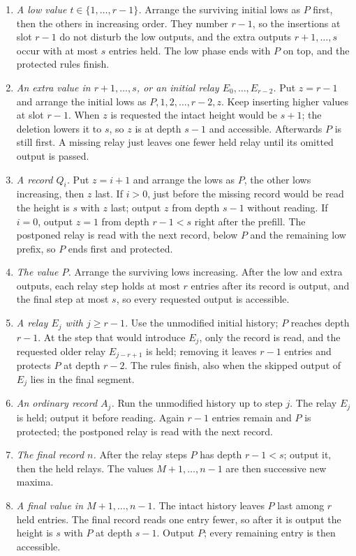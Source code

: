 \documentclass[11pt,letterpaper]{article}
\providecommand{\tightlist}{\setlength{\itemsep}{0pt}\setlength{\parskip}{0pt}}
\begin{document}
\begin{enumerate}
\def\labelenumi{\arabic{enumi}.}
\tightlist
\item
  \emph{A low value \(t\in\{1,\dots,r-1\}\).} Arrange the surviving
  initial lows as \(P\) first, then the others in increasing order. They
  number \(r-1\), so the insertions at slot \(r-1\) do not disturb the
  low outputs, and the extra outputs \(r+1,\dots,s\) occur with at most
  \(s\) entries held. The low phase ends with \(P\) on top, and the
  protected rules finish.
\item
  \emph{An extra value in \(r+1,\dots,s\), or an initial relay
  \(E_0,\dots,E_{r-2}\).} Put \(z=r-1\) and arrange the initial lows as
  \(P,1,2,\dots,r-2,z\). Keep inserting higher values at slot \(r-1\).
  When \(z\) is requested the intact height would be \(s+1\); the
  deletion lowers it to \(s\), so \(z\) is at depth \(s-1\) and
  accessible. Afterwards \(P\) is still first. A missing relay just
  leaves one fewer held relay until its omitted output is passed.
\item
  \emph{A record \(Q_i\).} Put \(z=i+1\) and arrange the lows as \(P\),
  the other lows increasing, then \(z\) last. If \(i>0\), just before
  the missing record would be read the height is \(s\) with \(z\) last;
  output \(z\) from depth \(s-1\) without reading. If \(i=0\), output
  \(z=1\) from depth \(r-1<s\) right after the prefill. The postponed
  relay is read with the next record, below \(P\) and the remaining low
  prefix, so \(P\) ends first and protected.
\item
  \emph{The value \(P\).} Arrange the surviving lows increasing. After
  the low and extra outputs, each relay step holds at most \(r\) entries
  after its record is output, and the final step at most \(s\), so every
  requested output is accessible.
\item
  \emph{A relay \(E_j\) with \(j\ge r-1\).} Use the unmodified initial
  history; \(P\) reaches depth \(r-1\). At the step that would introduce
  \(E_j\), only the record is read, and the requested older relay
  \(E_{j-r+1}\) is held; removing it leaves \(r-1\) entries and protects
  \(P\) at depth \(r-2\). The rules finish, also when the skipped output
  of \(E_j\) lies in the final segment.
\item
  \emph{An ordinary record \(A_j\).} Run the unmodified history up to
  step \(j\). The relay \(E_j\) is held; output it before reading. Again
  \(r-1\) entries remain and \(P\) is protected; the postponed relay is
  read with the next record.
\item
  \emph{The final record \(n\).} After the relay steps \(P\) has depth
  \(r-1<s\); output it, then the held relays. The values
  \(M+1,\dots,n-1\) are then successive new maxima.
\item
  \emph{A final value in \(M+1,\dots,n-1\).} The intact history leaves
  \(P\) last among \(r\) held entries. The final record reads one entry
  fewer, so after it is output the height is \(s\) with \(P\) at depth
  \(s-1\). Output \(P\); every remaining entry is then accessible.
\end{enumerate}
\end{document}
